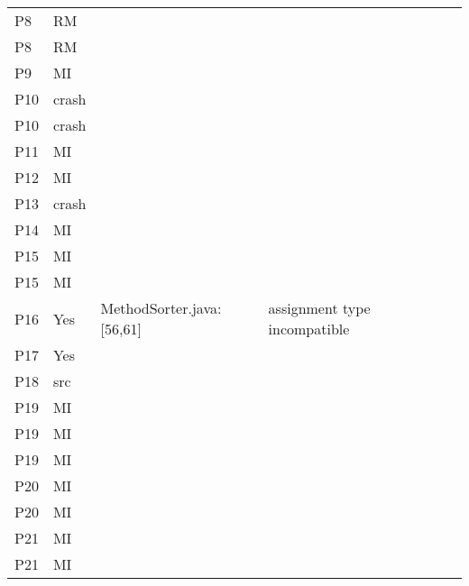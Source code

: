\begin{table}[]
\begin{tabular}{|p{1.5cm}|p{1cm}|p{3cm}|p{4cm}|p{2cm}|p{1.5cm}|}
        P8 & RM &  &  &  &  \\
        P8 & RM &  &  &  &  \\
        P9 & MI &  &  &  &  \\
        P10 & crash &  &  &  &  \\
        P10 & crash &  &  &  &  \\
        P11 & MI &  &  &  &  \\
        P12 & MI &  &  &  &  \\
        P13 & crash &  &  &  &  \\
        P14 & MI &  &  &  &  \\
        P15 & MI &  &  &  &  \\
        P15 & MI &  &  &  &  \\
        P16 & Yes & MethodSorter.java: [56,61]  & assignment type incompatible &  &  \\
        P17 & Yes &  &  &  &  \\
        P18 & src &  &  &  &  \\
        P19 & MI &  &  &  &  \\
        P19 & MI &  &  &  &  \\
        P19 & MI &  &  &  &  \\
        P20 & MI &  &  &  &  \\
        P20 & MI &  &  &  &  \\
        P21 & MI &  &  &  &  \\
        P21 & MI &  &  &  &  \\ \hline
    \end{tabular}
\end{table}
